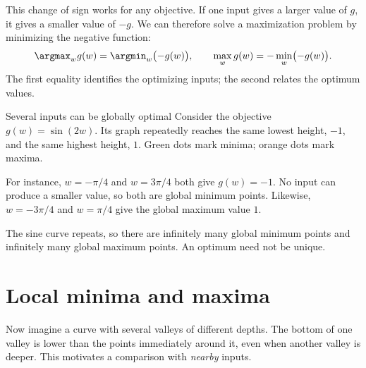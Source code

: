 \documentclass[a4paper,12pt,oneside]{report}
\begin{document}
This change of sign works for any objective. If one input gives a
larger value of $g$, it gives a smaller value of $-g$. We can therefore
solve a maximization problem by minimizing the negative function:
\[
  \argmax_w g(w)=\argmin_w\bigl(-g(w)\bigr),\qquad
  \max_w g(w)=-\min_w\bigl(-g(w)\bigr).
\]
The first equality identifies the optimizing inputs; the second
relates the optimum values.

\begin{framedexample}{Several inputs can be globally optimal}
Consider the objective $g(w)=\sin(2w)$. Its graph repeatedly reaches
the same lowest height, $-1$, and the same highest height, $1$.
Green dots mark minima; orange dots mark maxima.

\begin{center}
\end{center}

For instance, $w=-\pi/4$ and $w=3\pi/4$ both give $g(w)=-1$.
No input can produce a smaller value, so both are global minimum
points. Likewise, $w=-3\pi/4$ and $w=\pi/4$ give the global maximum
value $1$.

The sine curve repeats, so there are infinitely many global minimum
points and infinitely many global maximum points. An optimum need
not be unique.
\end{framedexample}

\section{Local minima and maxima}

Now imagine a curve with several valleys of different depths.
The bottom of one valley is lower than the points immediately around
it, even when another valley is deeper. This motivates a comparison
with \emph{nearby} inputs.
\end{document}
